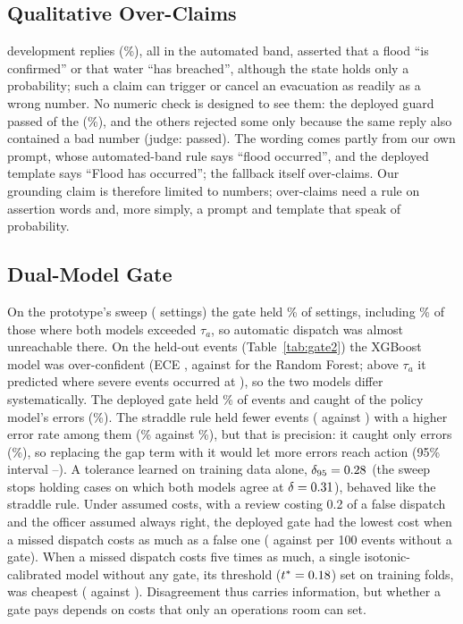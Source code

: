 \documentclass[conference]{IEEEtran}
\begin{document}
\subsection{Qualitative Over-Claims}
\label{sec:claims}
\OcDev{} development replies (\OcDevPct\%), all in the automated band, asserted that a flood ``is confirmed'' or that water ``has breached'', although the state holds only a probability; such a claim can trigger or cancel an evacuation as readily as a wrong number. No numeric check is designed to see them: the deployed guard passed \OcDevPassDep{} of the \OcDev{} (\OcDevPassDepPct\%), and the others rejected some only because the same reply also contained a bad number (judge: \OcDevPassJud{} passed). The wording comes partly from our own prompt, whose automated-band rule says ``flood occurred'', and the deployed template says ``Flood has occurred''; the fallback itself over-claims. \ClaimText{} Our grounding claim is therefore limited to numbers; over-claims need a rule on assertion words and, more simply, a prompt and template that speak of probability.

\subsection{Dual-Model Gate}
On the prototype's sweep (\DualN{} settings) the gate held \DualHold\% of settings, including \DualBothHeld\% of those where both models exceeded $\tau_a$, so automatic dispatch was almost unreachable there. On the \CalTest{} held-out events (Table~\ref{tab:gate2}) the XGBoost model was over-confident (ECE \EceXgb, against \EceRf{} for the Random Forest; above $\tau_a$ it predicted \XgbHighConf{} where severe events occurred at \XgbHighFreq), so the two models differ systematically. The deployed gate held \GateDepHold\% of events and caught \GtDepCaught{} of the policy model's \GtErrN{} errors (\GtDepRecall\%). The straddle rule held fewer events (\GtStHolds{} against \GtDepHolds) with a higher error rate among them (\GateStErrHeld\% against \GateDepErrHeld\%), but that is precision: it caught only \GtStCaught{} errors (\GtStRecall\%), so replacing the gap term with it would let \GtMore{} more errors reach action (95\% interval \GtMoreLo--\GtMoreHi). A tolerance learned on training data alone, $\delta_{95}=0.28$ (the sweep stops holding cases on which both models agree at $\delta=0.31$), behaved like the straddle rule. Under assumed costs, with a review costing 0.2 of a false dispatch and the officer assumed always right, the deployed gate had the lowest cost when a missed dispatch costs as much as a false one (\GtCostDepOne{} against \GtCostNoneOne{} per 100 events without a gate). When a missed dispatch costs five times as much, a single isotonic-calibrated model without any gate, its threshold ($t^\ast=0.18$) set on training folds, was cheapest (\GtCostCalFive{} against \GtCostDepFive). Disagreement thus carries information, but whether a gate pays depends on costs that only an operations room can set.
\end{document}
